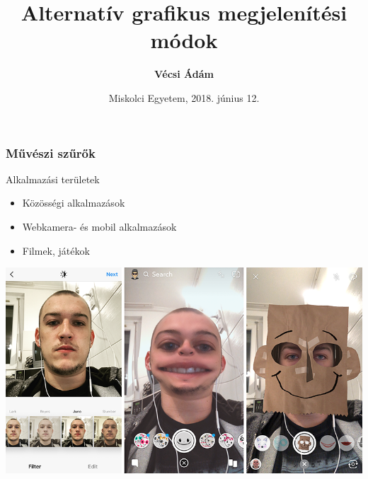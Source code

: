 \documentclass{beamer}
\begin{document}

\title[Alternatív grafikus megjelenítési módok]{Alternatív grafikus megjelenítési módok}
\author[Vécsi Ádám]{\textbf{Vécsi Ádám}}
\date{Miskolci Egyetem, 2018. június 12.}

\frame{\titlepage}

\begin{frame}[fragile]
\frametitle{Művészi szűrők}

Alkalmazási területek
\begin{itemize}
\item Közösségi alkalmazások
\item Webkamera- és mobil alkalmazások
\item Filmek, játékok
\end{itemize}

\bigskip

\begin{center}
\includegraphics[scale=0.25]{kepek/muveszi_szurok/instasnapmess.png}
\end{center}

\end{frame}
\end{document}
